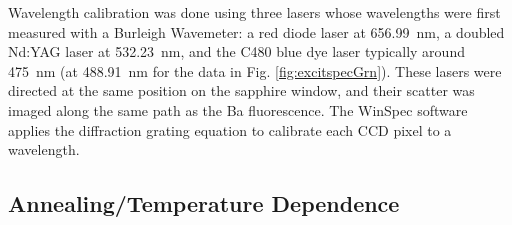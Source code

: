 
Wavelength calibration was done using three lasers whose wavelengths were first measured with a Burleigh Wavemeter:  a red diode laser at 656.99~nm, a doubled Nd:YAG laser at 532.23~nm, and the C480 blue dye laser typically around 475~nm (at 488.91~nm for the data in Fig. \ref{fig:excitspecGrn}).  These lasers were directed at the same position on the sapphire window, and their scatter was imaged along the same path as the Ba fluorescence.  The WinSpec software applies the diffraction grating equation to calibrate each CCD pixel to a wavelength.

\subsection{Annealing/Temperature Dependence}
\label{subsec:tempanneal}


